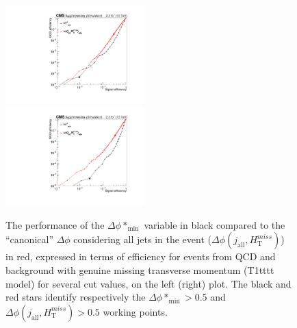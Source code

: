 \clearpage
\begin{figure}[tbhp]
    \caption{ 
    The performance of the $\Delta\phi*_{\mathrm{min}}$ variable in black compared to the ``canonical'' $\Delta\phi$ 
    considering all jets in the event ($\Delta\phi(j_{\mathrm{all}},H_{\mathrm{T}}^{miss})$) in red, 
    expressed in terms of efficiency for events from QCD and background with genuine missing transverse momentum (T1tttt model) 
    for several cut values, on the left (right) plot. 
    The black and red stars identify respectively the $\Delta\phi*_{\mathrm{min}}>0.5$ and $\Delta\phi(j_{\mathrm{all}},H_{\mathrm{T}}^{miss})>0.5$ working points. 
    \label{fig:bDPhi-ROC} }
  \begin{center}
     \includegraphics[width=0.48\textwidth]{ewk_ht800_aux} ~~
     \includegraphics[width=0.48\textwidth]{T1tttt_uncomp_ht800_aux}
  \end{center}
\end{figure}



